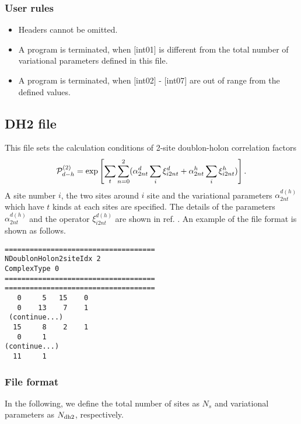 \subsubsection{User rules}
\begin{itemize}
\item Headers cannot be omitted. 
\item A program is terminated, when $[$int01$]$ is different from the total number of variational parameters defined in this file.
\item A program is terminated, when $[$int02$]$ - $[$int07$]$ are out of range from the defined values.
\end{itemize}

\newpage
\subsection{DH2 file}
\label{Subsec:DH2}
This file sets the calculation conditions of 2-site doublon-holon correlation factors 
\begin{equation}
{\cal P}_{d-h}^{(2)}= \exp \left[ \sum_t \sum_{n=0}^2 (\alpha_{2nt}^d \sum_{i}\xi_{i2nt}^d+\alpha_{2nt}^h \sum_{i}\xi_{i2nt}^h)\right].
\end{equation}
A site number $i$, the two sites around $i$ site and the variational parameters $\alpha_{2nt}^{d(h)}$ which have $t$ kinds at each sites are specified. The details of the parameters $\alpha_{2nt}^{d(h)}$ and the operator $\xi_{i2nt}^{d(h)}$ are shown in ref. \cite{Tahara2008}.
An example of the file format is shown as follows.

\begin{minipage}{12.5cm}
\begin{screen}
\begin{verbatim}
====================================
NDoublonHolon2siteIdx 2  
ComplexType 0
====================================
====================================
   0     5   15    0
   0    13    7    1
 (continue...)
  15     8    2    1
   0     1 
(continue...)
  11     1 
\end{verbatim}
\end{screen}
\end{minipage}

\subsubsection{File format}
In the following, we define the total number of sites as $N_s$ and variational parameters as $N_{\rm dh2}$, respectively.  

